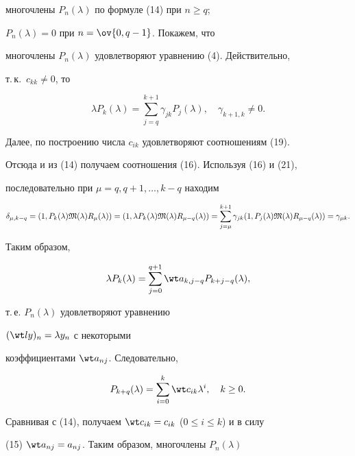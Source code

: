 многочлены $P_n(\lambda)$ по формуле (14) при $n\ge q$; 


$P_n(\lambda)=0$ при $n=\ov{0,q-1}$. Покажем, что 


многочлены $P_n(\lambda)$ удовлетворяют уравнению (4). Действительно, 


т.\,к.~$c_{kk}\ne 0$, то 


\begin{equation} 


\lambda P_k(\lambda)=\sum^{k+1}_{j=q}\gamma_{jk} 


P_j(\lambda),\quad \gamma_{k+1,k}\ne 0. 


\end{equation} 


Далее, по построению числа $c_{ik}$ удовлетворяют соотношениям (19). 


Отсюда и из (14) получаем соотношения (16). Используя (16) и (21), 


последовательно при $\mu=q,q+1,\dotsc,k-q$ находим 


$$


\delta_{\mu,k-q}=(1,P_k(\lambda)\frak M(\lambda) 


R_\mu(\lambda))=(1,\lambda P_k(\lambda)\frak M(\lambda) 


R_{\mu-q}(\lambda)) =


\sum^{k+1}_{j=\mu}\gamma_{jk}(1,P_j(\lambda)\frak M(\lambda) 


R_{\mu-q}(\lambda))=\gamma_{\mu k}. 


$$


Таким образом, 


$$ 


\lambda P_k(\lambda)=\sum^{q+1}_{j=0}\wt a_{k,j-q} 


P_{k+j-q}(\lambda), 


$$ 


т.\,е. $P_n(\lambda)$ удовлетворяют уравнению 


$(\wt ly)_n=\lambda y_n$ с некоторыми 


коэффициентами $\wt a_{nj}$. Следовательно, 


$$ 


P_{k+q}(\lambda)=\sum^k_{i=0}\wt c_{ik}\lambda^i,\quad 


k\ge 0. 


$$ 


Сравнивая с (14), получаем $\wt c_{ik}=c_{ik}$ ($0\le i\le k$) и в силу 


(15)\; $\wt a_{nj}=a_{nj}$. Таким образом, многочлены $P_n(\lambda)$ 


